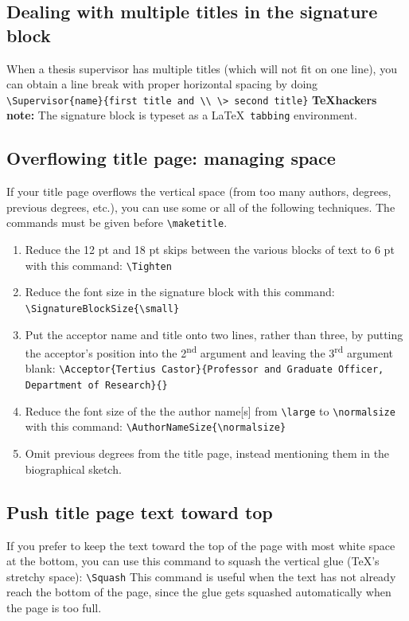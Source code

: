 \documentclass[11pt]{article}
\begin{document}
\subsection{Dealing with multiple titles in the signature block}\label{sec:6.3}
When a thesis supervisor has multiple titles (which will not fit on one line), you can obtain a line break with proper horizontal spacing by doing
	\vskip 5pt
	\quad\verb|\Supervisor{name}{first title and \\ \> second title}|
	\vskip 5pt
\noindent\textbf{\TeX hackers note:} The signature block is typeset as a \LaTeX\ \texttt{tabbing} environment.

\subsection{Overflowing title page: managing space} If your title page overflows the vertical space (from too many authors, degrees, previous degrees, etc.), you can use some or all of the following techniques. The commands must be given before \verb|\maketitle|.
\begin{enumerate}
 \item Reduce the 12 pt and 18 pt skips between the various blocks of text to 6 pt with this command:
	\vskip 5pt
	\noindent\verb|\Tighten|
 \item Reduce the font size in the signature block with this command:
	\vskip 5pt
	\noindent\verb|\SignatureBlockSize{\small}| 
 \item Put the acceptor name and title onto two lines, rather than three, by putting the acceptor's position into the 2\textsuperscript{nd} argument and leaving the 3\textsuperscript{rd} argument blank:
	\vskip 5pt
	{\small\noindent\verb|\Acceptor{Tertius Castor}{Professor and Graduate Officer, Department of Research}{}|}
 \item Reduce the font size of the the author name[s] from \verb|\large| to \verb|\normalsize| with this command:
	\vskip 5pt
	\noindent\verb|\AuthorNameSize{\normalsize}|
 \item Omit previous degrees from the title page, instead mentioning them in the biographical sketch.
\end{enumerate}


\subsection{Push title page text toward top} If you prefer to keep the text toward the top of the page with most white space at the bottom, you
can use this command to squash the vertical glue (\TeX's stretchy space):
	\vskip 5pt
	\quad\verb|\Squash| 
	\vskip 5pt
\noindent This command is useful when the text has not already reach the bottom of the page, since the glue gets squashed automatically when the page is too full.
\end{document}
